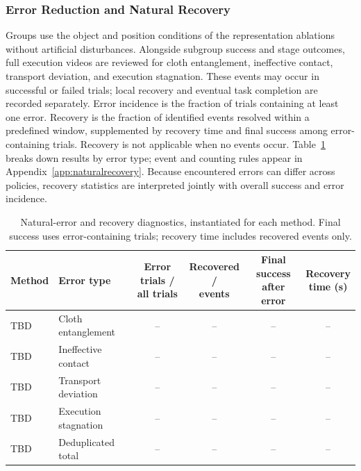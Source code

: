 \subsubsection{Error Reduction and Natural Recovery}
Groups use the object and position conditions of the representation ablations without artificial disturbances.
Alongside subgroup success and stage outcomes, full execution videos are reviewed for cloth entanglement, ineffective contact, transport deviation, and execution stagnation.
These events may occur in successful or failed trials; local recovery and eventual task completion are recorded separately.
Error incidence is the fraction of trials containing at least one error.
Recovery is the fraction of identified events resolved within a predefined window, supplemented by recovery time and final success among error-containing trials.
Recovery is not applicable when no events occur.
Table~\ref{tab:recoveryruntime} breaks down results by error type; event and counting rules appear in Appendix~\ref{app:naturalrecovery}.
Because encountered errors can differ across policies, recovery statistics are interpreted jointly with overall success and error incidence.

\begin{table}[!t]
\caption{Natural-error and recovery diagnostics, instantiated for each method. Final success uses error-containing trials; recovery time includes recovered events only.}
\label{tab:recoveryruntime}
\centering\small
\begin{tabular}{llcccc}
\toprule
Method & Error type & \shortstack{Error trials /\\all trials} & \shortstack{Recovered /\\events} & \shortstack{Final success\\after error} & \shortstack{Recovery\\time (s)}\\
\midrule
TBD & Cloth entanglement & -- & -- & -- & --\\
TBD & Ineffective contact & -- & -- & -- & --\\
TBD & Transport deviation & -- & -- & -- & --\\
TBD & Execution stagnation & -- & -- & -- & --\\
TBD & Deduplicated total & -- & -- & -- & --\\
\bottomrule
\end{tabular}
\end{table}

